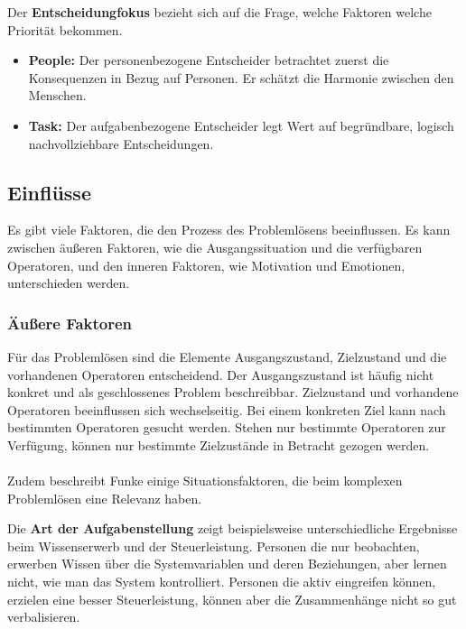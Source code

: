 Der \textbf{Entscheidungfokus} bezieht sich auf die Frage, welche Faktoren welche Priorität bekommen.
	\begin{itemize}
	\item \textbf{People:} Der personenbezogene Entscheider betrachtet zuerst die Konsequenzen in Bezug auf Personen. Er schätzt die Harmonie zwischen den Menschen.
	\item \textbf{Task:} Der aufgabenbezogene Entscheider legt Wert auf begründbare, logisch nachvollziehbare Entscheidungen.
	\end{itemize}

\subsection{Einflüsse}
Es gibt viele Faktoren, die den Prozess des Problemlösens beeinflussen. Es kann  zwischen äußeren Faktoren, wie die Ausgangssituation und die verfügbaren Operatoren, und den inneren Faktoren, wie Motivation und Emotionen, unterschieden werden.

\subsubsection*{Äußere Faktoren}
Für das Problemlösen sind die Elemente Ausgangszustand, Zielzustand und die vorhandenen Operatoren entscheidend. Der Ausgangszustand ist häufig nicht konkret und als geschlossenes Problem beschreibbar. Zielzustand und vorhandene Operatoren beeinflussen sich wechselseitig. Bei einem konkreten Ziel kann nach bestimmten Operatoren gesucht werden. Stehen nur bestimmte Operatoren zur Verfügung, können nur bestimmte Zielzustände in Betracht gezogen werden. \cite{Funke2015}
\\ \\
Zudem beschreibt Funke \cite{Funke2015} einige Situationsfaktoren, die beim komplexen Problemlösen eine Relevanz haben.

Die \textbf{Art der Aufgabenstellung} zeigt beispielsweise unterschiedliche Ergebnisse beim Wissenserwerb und der Steuerleistung. Personen die nur beobachten, erwerben Wissen über die Systemvariablen und deren Beziehungen, aber lernen nicht, wie man das System kontrolliert. Personen die aktiv eingreifen können, erzielen eine besser Steuerleistung, können aber die Zusammenhänge nicht so gut verbalisieren.

